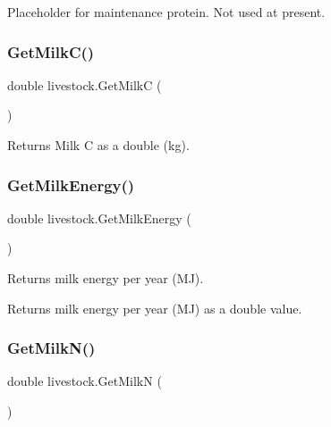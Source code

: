Placeholder for maintenance protein. Not used at present. 

\mbox{\label{classlivestock_a2d1f6bb0b58f669ccebb29a642221688}} 
\subsubsection{\texorpdfstring{GetMilkC()}{GetMilkC()}}
{\footnotesize\ttfamily double livestock.\+Get\+MilkC (\begin{DoxyParamCaption}{ }\end{DoxyParamCaption})\hspace{0.3cm}{\ttfamily [inline]}}



Returns Milk C as a double (kg). 

\mbox{\label{classlivestock_a3769db690d5b53d96e92a5497b17bcd2}} 
\subsubsection{\texorpdfstring{GetMilkEnergy()}{GetMilkEnergy()}}
{\footnotesize\ttfamily double livestock.\+Get\+Milk\+Energy (\begin{DoxyParamCaption}{ }\end{DoxyParamCaption})\hspace{0.3cm}{\ttfamily [inline]}}



Returns milk energy per year (MJ). 

\begin{DoxyReturn}{Returns}
milk energy per year (MJ) as a double value. 
\end{DoxyReturn}
\mbox{\label{classlivestock_a8141a1b0547d065a4eef1878aab12396}} 
\subsubsection{\texorpdfstring{GetMilkN()}{GetMilkN()}}
{\footnotesize\ttfamily double livestock.\+Get\+MilkN (\begin{DoxyParamCaption}{ }\end{DoxyParamCaption})\hspace{0.3cm}{\ttfamily [inline]}}



